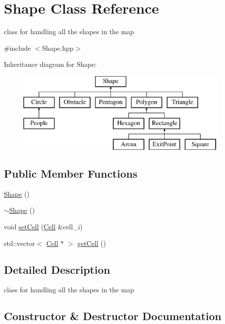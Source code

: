 \hypertarget{class_shape}{}\section{Shape Class Reference}
\label{class_shape}


class for handling all the shapes in the map  




{\ttfamily \#include $<$Shape.\+hpp$>$}

Inheritance diagram for Shape\+:\begin{figure}[H]
\begin{center}
\leavevmode
\includegraphics[height=4.000000cm]{class_shape}
\end{center}
\end{figure}
\subsection*{Public Member Functions}
\begin{DoxyCompactItemize}
\item 
\mbox{\hyperlink{class_shape_aaa8d87171e65e0d8ba3c5459978992a7}{Shape}} ()
\item 
\mbox{\hyperlink{class_shape_a935afc9e576015f967d90de56977167d}{$\sim$\+Shape}} ()
\item 
void \mbox{\hyperlink{class_shape_af40ad140cf111c7d50923fbe140da9ad}{set\+Cell}} (\mbox{\hyperlink{class_cell}{Cell}} \&cell\+\_\+i)
\item 
std\+::vector$<$ \mbox{\hyperlink{class_cell}{Cell}} $\ast$ $>$ \mbox{\hyperlink{class_shape_a2f76c3ebe64d63910fc10e9c04ae3685}{get\+Cell}} ()
\end{DoxyCompactItemize}


\subsection{Detailed Description}
class for handling all the shapes in the map 

\subsection{Constructor \& Destructor Documentation}
\mbox{\label{class_shape_aaa8d87171e65e0d8ba3c5459978992a7}} 
